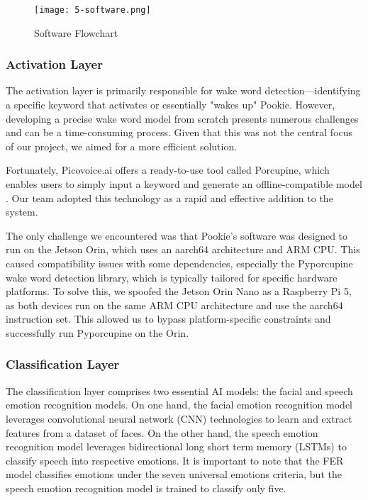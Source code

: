 \begin{figure}[!ht]
    \centering
    \captionsetup{justification=centering}
    \texttt{[image: 5-software.png]}
    \caption{Software Flowchart}
    \label{fig:5-software}
\end{figure}

\subsubsection{Activation Layer}
The activation layer is primarily responsible for wake word detection—identifying a specific keyword that activates or essentially "wakes up" Pookie. However, developing a precise wake word model from scratch presents numerous challenges and can be a time-consuming process. Given that this was not the central focus of our project, we aimed for a more efficient solution.

Fortunately, Picovoice.ai offers a ready-to-use tool called Porcupine, which enables users to simply input a keyword and generate an offline-compatible model \cite{picovoice_porcupine}. Our team adopted this technology as a rapid and effective addition to the system.

The only challenge we encountered was that Pookie's software was designed to run on the Jetson Orin, which uses an aarch64 architecture and ARM CPU. This caused compatibility issues with some dependencies, especially the Pyporcupine wake word detection library, which is typically tailored for specific hardware platforms. To solve this, we spoofed the Jetson Orin Nano as a Raspberry Pi 5, as both devices run on the same ARM CPU architecture and use the aarch64 instruction set. This allowed us to bypass platform-specific constraints and successfully run Pyporcupine on the Orin.

\subsubsection{Classification Layer}
\label{sec:classification-layer}
The classification layer comprises two essential AI models: the facial and speech emotion recognition models. On one hand, the facial emotion recognition model leverages convolutional neural network (CNN) technologies to learn and extract features from a dataset of faces. On the other hand, the speech emotion recognition model leverages bidirectional long short term memory (LSTMs) to classify speech into respective emotions. It is important to note that the FER model classifies emotions under the seven universal emotions criteria, but the speech emotion recognition model is trained to classify only five. 

